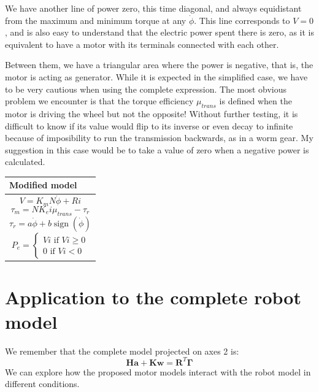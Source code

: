 \documentclass[12pt]{article}
\renewcommand{\vec}[1]{\bm{#1}}
\newcommand{\R}{\mathbb R}
\def\R{\vec R}
\begin{document}
We have another line of power zero, this time diagonal, and always equidistant from the maximum and minimum torque at any $\dot{\phi}$. This line corresponds to $V = 0$, and is also easy to understand that the electric power spent there is zero, as it is equivalent to have a motor with its terminals connected with each other.

Between them, we have a triangular area where the power is negative, that is, the motor is acting as generator. While it is expected in the simplified case, we have to be very cautious when using the complete expression. The most obvious problem we encounter is that the torque efficiency $\mu_{trans}$ is defined when the motor is driving the wheel but not the opposite! Without further testing, it is difficult to know if its value would flip to its inverse or even decay to infinite because of imposibility to run the transmission backwards, as in a worm gear. My suggestion in this case would be to take a value of zero when a negative power is calculated.
\begin{center}
	\begin{tabular}{ | m{14em} | } 
		\hline
		Modified model \\ 
		\hline
		$$ V = K_m N\dot{\phi} + Ri$$
		$$ \tau_m = N K_ei\mu_{trans} - \tau_r$$
		$$ \tau_r = a \dot{\phi} + b \operatorname{sign}(\dot{\phi}) $$
		$$ P_{e}=\begin{cases}
			Vi \text{  if  } Vi\geq 0\\
			0 \text{  if  } Vi < 0
		\end{cases}$$\\
		
		\hline
	\end{tabular}
\end{center}


\section{Application to the complete robot model}

We remember that the complete model projected on axes 2 is:
$$\vec{H} \vec a+\vec K\vec w=\R^T\vec\Gamma$$
We can explore how the proposed motor models interact with the robot model in different conditions.
\end{document}
